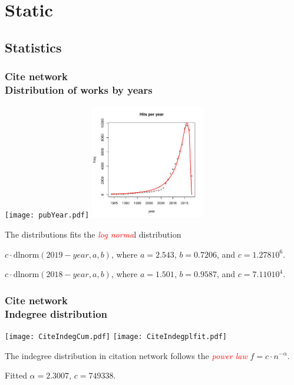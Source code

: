 \documentclass[hyperref={pdfstartview={FitBH -32768},
                         pdfpagemode=FullScreen,
                         plainpages=false,
                         colorlinks=true}
              ]{beamer}
\newcommand{\keyw}[1]{\textcolor{red}{\emph{#1}}}
\begin{document}
\section{Static}
\subsection{Statistics}


\begin{frame}[fragile]
\frametitle{Cite network\label{maxinc}\\ \normalsize Distribution of works by years}

\texttt{[image: pubYear.pdf]}
\includegraphics[width=50mm]{yearshits7.pdf}

\small
The distributions fits the \keyw{log norma}l distribution 

\footnotesize
$c\cdot \mbox{dlnorm}(2019-year,a,b)$, where $a = 2.543$, $b = 0.7206$, and $c = 1.278 10^6$. \medskip

$c\cdot \mbox{dlnorm}(2018-year,a,b)$, where $a = 1.501$, $b = 0.9587$, and $c = 7.110 10^4$.\medskip

\end{frame}

\begin{frame}[fragile]
\frametitle{Cite network\label{maxind}\\ \normalsize Indegree distribution}

\texttt{[image: CiteIndegCum.pdf]}
\texttt{[image: CiteIndegplfit.pdf]}

\small
The indegree distribution in citation network follows the \keyw{power law} $f = c \cdot n^{-\alpha}$.

Fitted $\alpha = 2.3007$, $c=749338$.
\end{frame}
\end{document}
